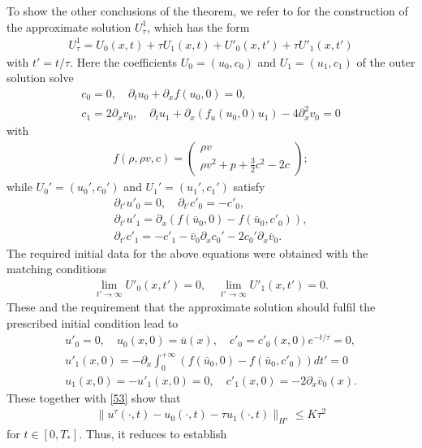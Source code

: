 \documentclass{article}
\theoremstyle{plain}
\begin{document}
To show the other conclusions of the theorem, we refer to \cite{yong1992singular,yong1999singular} for the construction of the approximate solution $U_\tau^1$, which has the form
\begin{eqnarray*}
U^1_\tau  = U_0(x,t) + \tau U_1(x,t) + U'_0(x,t') + \tau U'_1(x,t')
\end{eqnarray*}
with $t'=t/\tau$.
Here the coefficients $U_0=(u_0, c_0)$ and $U_1=(u_1, c_1)$ of the outer solution solve
\begin{eqnarray}
  c_0 = 0, \quad
  \partial_t u_0+ \partial_x f(u_0,0)=0 , \nonumber \\
  c_1 = 2\partial_x v_0, \quad
  \partial_t u_1 + \partial_x (f_u(u_0,0) u_1)  -4 \partial^2_x v_0 = 0 \label{54}
\end{eqnarray}
with
\begin{eqnarray*}
  f(\rho,\rho v,c) = \left( \begin{array}{cc} \rho v \\ \rho v^2 + p + \frac{3}{2} c^2 - 2c \end{array} \right);
\end{eqnarray*}
while $U_0'=(u_0', c_0')$ and $U_1'=(u_1', c_1')$ satisfy
\begin{eqnarray*}
 \partial_{t'} u'_0 = 0,  \quad \partial_{t'} c'_0 = -c'_0 , \\
  \partial_{t'} u'_1 = \partial_x(f(\bar u_0,0) - f(\bar u_0,c'_0)), \\
  \partial_{t'} c'_1 = - c'_1 - \bar v_0 \partial_x c_0' -2c_0'\partial_x \bar v_0.
\end{eqnarray*}
The required initial data for the above equations were obtained with the matching conditions
\begin{eqnarray*}
  \lim_{t' \to \infty} U'_0(x,t') = 0 , \quad \lim_{t' \to \infty} U'_1(x,t') = 0 .
\end{eqnarray*}
These and the requirement that the approximate solution should fulfil the prescribed initial condition lead to
\begin{eqnarray*}
 u'_0 =0, \quad u_0(x,0) = \bar{u}(x), \quad  c'_0 =c'_0(x,0)e^{-t/\tau}=0 , \\[4mm]
 u'_1(x,0) = -\partial_x\int_0^{+\infty} (f(\bar u_0,0) - f(\bar u_0,c'_0)) dt'=0\\
 u_1(x,0) =  - u'_1(x,0)=0, \quad c'_1(x,0) = - 2\partial_x\bar v_0(x).
\end{eqnarray*}
These together with \eqref{53} show that
\begin{eqnarray*}
  \|u^\tau(\cdot, t) - u_0 (\cdot, t) - \tau u_1(\cdot, t) \|_{H^s} \le K \tau^2
\end{eqnarray*}
for $t \in [0,T_*]$. Thus, it reduces to establish
\end{document}
